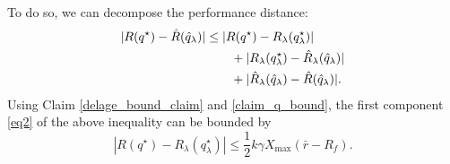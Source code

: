 \documentclass[11pt]{article}
\begin{document}
To do so, we can decompose the performance distance:
\begin{align}
  |R({q^\star}) - \hat R({\hat q}_\lambda)| &\leq |R({q^\star}) - R_\lambda(q^\star_\lambda)|\label{eq2}\\
                                      &\qquad + |R_\lambda(q^\star_\lambda) - \hat R_\lambda(\hat q_\lambda)|\label{eq3}\\
                                      &\qquad + |\hat R_\lambda(\hat q_\lambda) - \hat R(\hat q_\lambda)|\label{eq4}.
\end{align}
Using Claim \ref{delage_bound_claim} and \ref{claim_q_bound}, the first component
\eqref{eq2} of the above inequality can be bounded by
\begin{equation*}
  |R(q^\star) - R_\lambda(q^\star_\lambda)| \leq \frac{1}{2}k\gamma X_{\max}(\bar r-R_f).
\end{equation*}



\newpage

\end{document}
